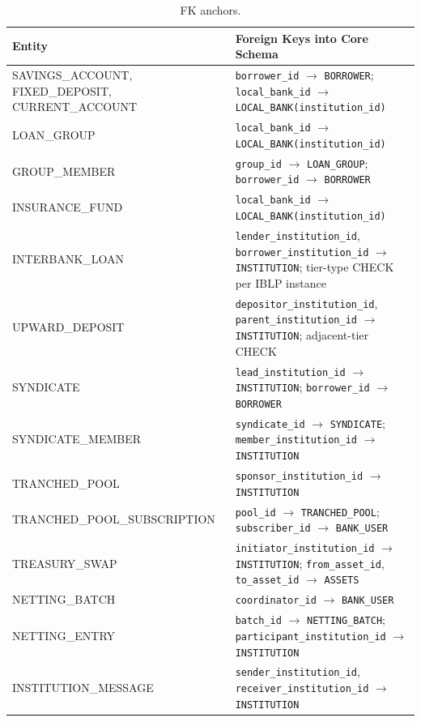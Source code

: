 \begin{table}[H]
\centering
\caption[FK anchors]{FK anchors.}
\label{tab:ext-entity-fks}
\small
\begin{tabular}{@{}p{3.5cm}p{8.5cm}@{}}
\toprule
\tableheadcolor
\textbf{Entity} & \textbf{Foreign Keys into Core Schema} \\
\midrule
SAVINGS\_ACCOUNT, FIXED\_DEPOSIT, CURRENT\_ACCOUNT & \texttt{borrower\_id} $\to$ \texttt{BORROWER}; \texttt{local\_bank\_id} $\to$ \texttt{LOCAL\_BANK(institution\_id)} \\
LOAN\_GROUP & \texttt{local\_bank\_id} $\to$ \texttt{LOCAL\_BANK(institution\_id)} \\
GROUP\_MEMBER & \texttt{group\_id} $\to$ \texttt{LOAN\_GROUP}; \texttt{borrower\_id} $\to$ \texttt{BORROWER} \\
INSURANCE\_FUND & \texttt{local\_bank\_id} $\to$ \texttt{LOCAL\_BANK(institution\_id)} \\
INTERBANK\_LOAN & \texttt{lender\_institution\_id}, \texttt{borrower\_institution\_id} $\to$ \texttt{INSTITUTION}; tier-type CHECK per IBLP instance \\
UPWARD\_DEPOSIT & \texttt{depositor\_institution\_id}, \texttt{parent\_institution\_id} $\to$ \texttt{INSTITUTION}; adjacent-tier CHECK \\
SYNDICATE & \texttt{lead\_institution\_id} $\to$ \texttt{INSTITUTION}; \texttt{borrower\_id} $\to$ \texttt{BORROWER} \\
SYNDICATE\_MEMBER & \texttt{syndicate\_id} $\to$ \texttt{SYNDICATE}; \texttt{member\_institution\_id} $\to$ \texttt{INSTITUTION} \\
TRANCHED\_POOL & \texttt{sponsor\_institution\_id} $\to$ \texttt{INSTITUTION} \\
TRANCHED\_POOL\_SUBSCRIPTION & \texttt{pool\_id} $\to$ \texttt{TRANCHED\_POOL}; \texttt{subscriber\_id} $\to$ \texttt{BANK\_USER} \\
TREASURY\_SWAP & \texttt{initiator\_institution\_id} $\to$ \texttt{INSTITUTION}; \texttt{from\_asset\_id}, \texttt{to\_asset\_id} $\to$ \texttt{ASSETS} \\
NETTING\_BATCH & \texttt{coordinator\_id} $\to$ \texttt{BANK\_USER} \\
NETTING\_ENTRY & \texttt{batch\_id} $\to$ \texttt{NETTING\_BATCH}; \texttt{participant\_institution\_id} $\to$ \texttt{INSTITUTION} \\
INSTITUTION\_MESSAGE & \texttt{sender\_institution\_id}, \texttt{receiver\_institution\_id} $\to$ \texttt{INSTITUTION} \\

\end{tabular}
\end{table}
